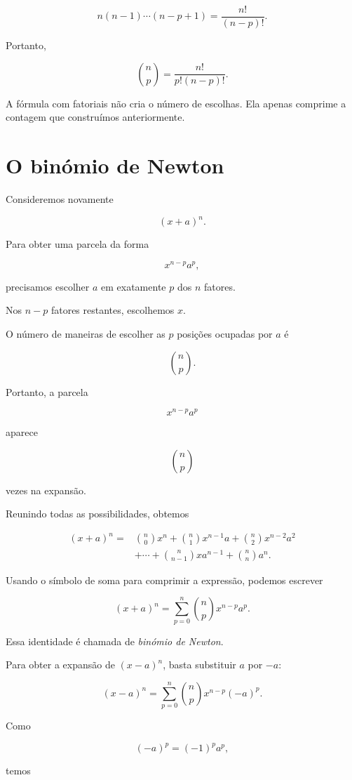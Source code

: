 \documentclass[12pt,a4paper]{article}
\begin{document}
\[
n(n-1)\cdots(n-p+1)
=
\frac{n!}{(n-p)!}.
\]

Portanto,

\[
\binom{n}{p}
=
\frac{n!}{p!(n-p)!}.
\]

A fórmula com fatoriais não cria o número de escolhas. Ela apenas
comprime a contagem que construímos anteriormente.

\section{O binómio de Newton}

Consideremos novamente

\[
(x+a)^n.
\]

Para obter uma parcela da forma

\[
x^{n-p}a^p,
\]

precisamos escolher \(a\) em exatamente \(p\) dos \(n\) fatores.

Nos \(n-p\) fatores restantes, escolhemos \(x\).

O número de maneiras de escolher as \(p\) posições ocupadas por \(a\) é

\[
\binom{n}{p}.
\]

Portanto, a parcela

\[
x^{n-p}a^p
\]

aparece

\[
\binom{n}{p}
\]

vezes na expansão.

Reunindo todas as possibilidades, obtemos

\[
\begin{aligned}
(x+a)^n
={}&
\binom{n}{0}x^n
+
\binom{n}{1}x^{n-1}a
+
\binom{n}{2}x^{n-2}a^2\\
&+\cdots+
\binom{n}{n-1}xa^{n-1}
+
\binom{n}{n}a^n.
\end{aligned}
\]

Usando o símbolo de soma para comprimir a expressão, podemos escrever

\[
(x+a)^n
=
\sum_{p=0}^{n}
\binom{n}{p}
x^{n-p}a^p.
\]

Essa identidade é chamada de \emph{binómio de Newton}.

Para obter a expansão de \((x-a)^n\), basta substituir \(a\) por
\(-a\):

\[
(x-a)^n
=
\sum_{p=0}^{n}
\binom{n}{p}
x^{n-p}(-a)^p.
\]

Como

\[
(-a)^p=(-1)^pa^p,
\]

temos
\end{document}
